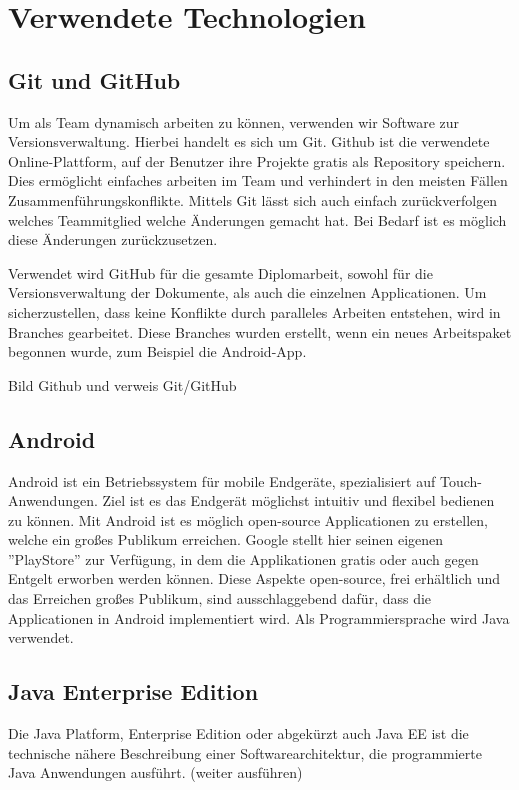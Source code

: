 \chapter{Verwendete Technologien}
\section{Git und GitHub}
Um als Team dynamisch arbeiten zu können, verwenden wir Software zur Versionsverwaltung. Hierbei handelt es sich um Git. 
Github ist die verwendete Online-Plattform, auf der Benutzer ihre Projekte gratis als Repository speichern. Dies ermöglicht einfaches arbeiten im Team und verhindert in den meisten Fällen Zusammenführungskonflikte. Mittels Git lässt sich auch einfach zurückverfolgen welches Teammitglied welche Änderungen gemacht hat. Bei Bedarf ist es möglich diese Änderungen zurückzusetzen.

Verwendet wird GitHub für die gesamte Diplomarbeit, sowohl für die Versionsverwaltung der Dokumente, als auch die einzelnen Applicationen. Um sicherzustellen, dass keine Konflikte durch paralleles Arbeiten entstehen, wird in Branches gearbeitet. Diese Branches wurden erstellt, wenn ein neues Arbeitspaket begonnen wurde, zum Beispiel die Android-App.

Bild Github und verweis Git/GitHub

\section{Android}

Android ist ein Betriebssystem für mobile Endgeräte, spezialisiert auf Touch-Anwendungen. Ziel ist es das Endgerät möglichst intuitiv und flexibel bedienen zu können. Mit Android ist es möglich open-source Applicationen zu erstellen, welche ein großes Publikum erreichen. Google stellt hier seinen eigenen ''PlayStore'' zur Verfügung, in dem die Applikationen gratis oder auch gegen Entgelt erworben werden können.
Diese Aspekte open-source, frei erhältlich und das Erreichen großes Publikum, sind ausschlaggebend dafür, dass die Applicationen in Android implementiert wird. Als Programmiersprache wird Java verwendet.
\\
\section{Java Enterprise Edition}\label{sec:javaee}
Die Java Platform, Enterprise Edition oder abgekürzt auch Java EE ist die technische nähere Beschreibung einer Softwarearchitektur, die programmierte Java Anwendungen ausführt.
(weiter ausführen)

